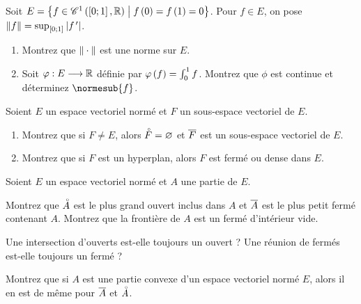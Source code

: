 \begin{exopss}[Exercice 13]
Soit \(E=\left\lbrace f\in\mathscr{C}^{1}\left(\left[0;1\right],\mathbb{R}\right)\;\middle|\; f\left(0\right)=f\left(1\right)=0\right\rbrace\). Pour \(f\in E\), on pose \(\norme{f}=\sup_{\intervii{0}{1}}\abs{f\prim}\).

\begin{enumerate}
    \item Montrez que \(\norme{}\) est une norme sur \(E\). \\
    \item Soit \(\varphi:E\longrightarrow\mathbb{R}\) définie par \(\varphi\left(f\right)=\int_0^1f\). Montrez que \(\phi\) est continue et déterminez \(\normesub{f}\).
\end{enumerate}
\end{exopss}



\begin{exopss}[Exercice 14]
Soient \(E\) un espace vectoriel normé et \(F\) un sous-espace vectoriel de \(E\).

\begin{enumerate}
    \item Montrez que si \(F\not=E\), alors \(\accentset{\circ}{F}=\varnothing\) et \(\overline{F}\) est un sous-espace vectoriel de \(E\). \\
    \item Montrez que si \(F\) est un hyperplan, alors \(F\) est fermé ou dense dans \(E\).
\end{enumerate}
\end{exopss}



\begin{exops}[Exercice 15]
Soient \(E\) un espace vectoriel normé et \(A\) une partie de \(E\).

Montrez que \(\accentset{\circ}{A}\) est le plus grand ouvert inclus dans \(A\) et \(\overline{A}\) est le plus petit fermé contenant \(A\). Montrez que la frontière de \(A\) est un fermé d'intérieur vide.
\end{exops}



\begin{exos}[Exercice 16]
Une intersection d'ouverts est-elle toujours un ouvert ? Une réunion de fermés est-elle toujours un fermé ?
\end{exos}



\begin{exops}[Exercice 17]
Montrez que si \(A\) est une partie convexe d'un espace vectoriel normé \(E\), alors il en est de même pour \(\overline{A}\) et \(\accentset{\circ}{A}\).
\end{exops}



